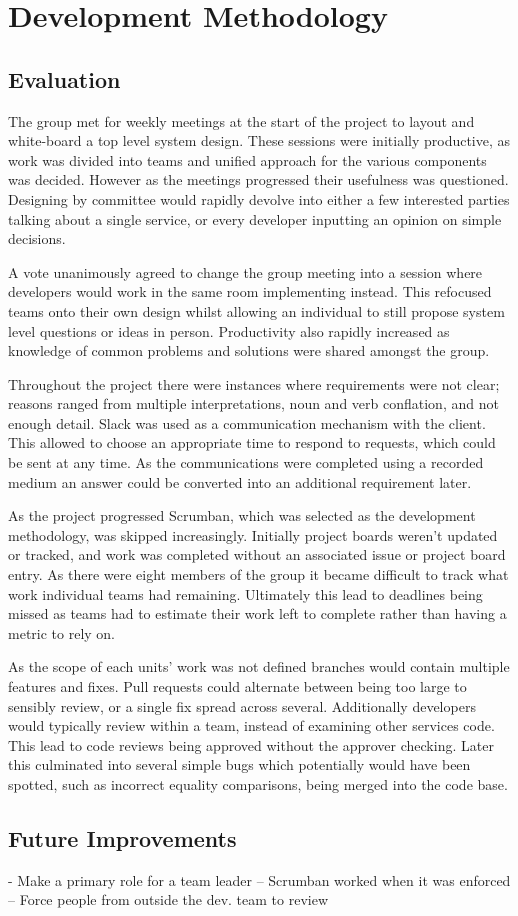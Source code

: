 \section{Development Methodology}
\subsection{Evaluation}
\par
The group met for weekly meetings at the start of the project to layout and white-board a top level system design. These sessions were initially productive, as work was divided into teams and unified approach for the various components was decided. However as the meetings progressed their usefulness was questioned. Designing by committee would rapidly devolve into either a few interested parties talking about a single service, or every developer inputting an opinion on simple decisions.

\par
A vote unanimously agreed to change the group meeting into a session where developers would work in the same room implementing instead. This refocused teams onto their own design whilst allowing an individual to still propose system level questions or ideas in person. Productivity also rapidly increased as knowledge of common problems and solutions were shared amongst the group.

\par
Throughout the project there were instances where requirements were not clear; reasons ranged from multiple interpretations, noun and verb conflation, and not enough detail. Slack was used as a communication mechanism with the client. This allowed to choose an appropriate time to respond to requests, which could be sent at any time. As the communications were completed using a recorded medium an answer could be converted into an additional requirement later.

\par
As the project progressed Scrumban, which was selected as the development methodology, was skipped increasingly. Initially project boards weren't updated or tracked, and work was completed without an associated issue or project board entry. As there were eight members of the group it became difficult to track what work individual teams had remaining. Ultimately this lead to deadlines being missed as teams had to estimate their work left to complete rather than having a metric to rely on.

\par
As the scope of each units' work was not defined branches would contain multiple features and fixes. Pull requests could alternate between being too large to sensibly review, or a single fix spread across several. Additionally developers would typically review within a team, instead of examining other services code. This lead to code reviews being approved without the approver checking. Later this culminated into several simple bugs which potentially would have been spotted, such as incorrect equality comparisons, being merged into the code base.

\subsection{Future Improvements}
    - Make a primary role for a team leader
        -- Scrumban worked when it was enforced
        -- Force people from outside the dev. team to review